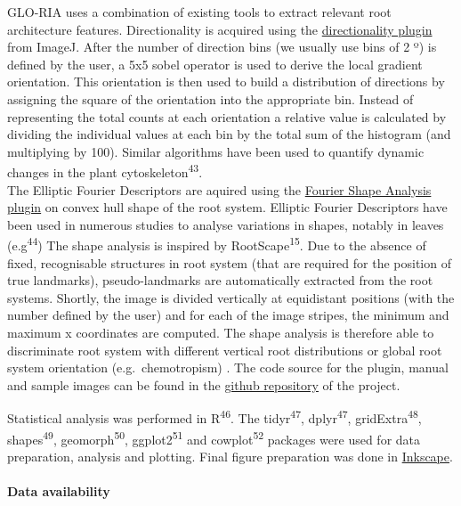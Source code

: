 \documentclass[]{article}
\begin{document}
GLO-RIA uses a combination of existing tools to extract relevant root
architecture features. Directionality is acquired using the
\href{http://fiji.sc/Directionality}{directionality plugin} from ImageJ.
After the number of direction bins (we usually use bins of 2 º) is
defined by the user, a 5x5 sobel operator is used to derive the local
gradient orientation. This orientation is then used to build a
distribution of directions by assigning the square of the orientation
into the appropriate bin. Instead of representing the total counts at
each orientation a relative value is calculated by dividing the
individual values at each bin by the total sum of the histogram (and
multiplying by 100). Similar algorithms have been used to quantify
dynamic changes in the plant cytoskeleton\textsuperscript{43}.\\The
Elliptic Fourier Descriptors are aquired using the
\href{http://imagejdocu.tudor.lu/doku.php?id=plugin:analysis:fourier_shape_analysis:start}{Fourier
Shape Analysis plugin} on convex hull shape of the root system. Elliptic
Fourier Descriptors have been used in numerous studies to analyse
variations in shapes, notably in leaves (e.g\textsuperscript{44}) The
shape analysis is inspired by RootScape\textsuperscript{15}. Due to the
absence of fixed, recognisable structures in root system (that are
required for the position of true landmarks), pseudo-landmarks are
automatically extracted from the root systems. Shortly, the image is
divided vertically at equidistant positions (with the number defined by
the user) and for each of the image stripes, the minimum and maximum x
coordinates are computed. The shape analysis is therefore able to
discriminate root system with different vertical root distributions or
global root system orientation (e.g.~chemotropism) . The code source for
the plugin, manual and sample images can be found in the
\href{https://github.com/rr-lab/GLO-Roots/tree/master/gloria}{github
repository} of the project.

Statistical analysis was performed in R\textsuperscript{46}. The
tidyr\textsuperscript{47}, dplyr\textsuperscript{47},
gridExtra\textsuperscript{48}, shapes\textsuperscript{49},
geomorph\textsuperscript{50}, ggplot2\textsuperscript{51} and
cowplot\textsuperscript{52} packages were used for data preparation,
analysis and plotting. Final figure preparation was done in
\href{https://inkscape.org/en/}{Inkscape}.

\paragraph{Data availability}\label{data-availability}
\end{document}
